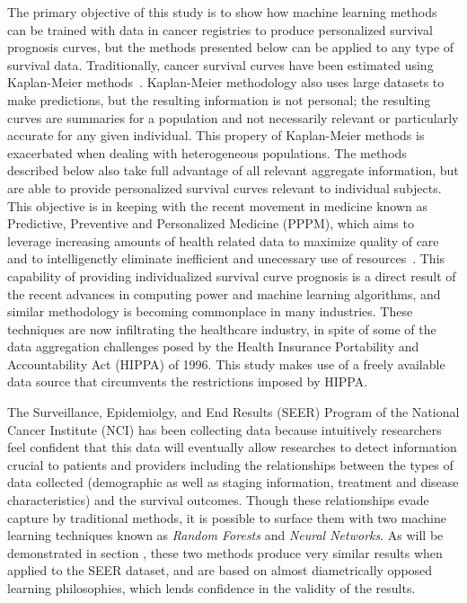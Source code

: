 \documentclass[10pt,letterpaper]{article}
\begin{document}
The primary objective of this study is to show how machine learning methods can be trained with data in cancer registries to produce personalized survival prognosis curves, but the methods presented below can be applied to any type of survival data. Traditionally, cancer survival curves have been estimated using Kaplan-Meier methods~\cite{cam}. Kaplan-Meier methodology also uses large datasets to make predictions, but the resulting information is not personal; the resulting curves are summaries for a population and not necessarily relevant or particularly accurate for any given individual. This propery of Kaplan-Meier methods is exacerbated when dealing with heterogeneous populations.  The methods described below also take full advantage of all relevant aggregate information, but are able to provide personalized survival curves relevant to individual subjects. This objective is in keeping with the recent movement in medicine known as Predictive, Preventive and Personalized Medicine (PPPM), which aims to leverage increasing amounts of health related data to maximize quality of care and to intelligenctly eliminate inefficient and unecessary use of resources~\cite{VanPoucke2016}.
This capability of providing individualized survival curve prognosis is a direct result of the recent advances in computing power and machine learning algorithms, and similar methodology is becoming commonplace in many industries.
 These techniques are now infiltrating the healthcare industry, in spite of some of the data aggregation challenges posed by the Health Insurance Portability and Accountability Act (HIPPA) of 1996. This study makes use of a freely available data source that circumvents the restrictions imposed by HIPPA.



The Surveillance, Epidemiolgy, and End Results (SEER) Program of the National Cancer Institute (NCI) has been collecting data because intuitively 
researchers feel confident
 that this data will eventually allow researches to detect information crucial to patients and providers including the relationships between the types of data collected (demographic as well as staging information, treatment and disease characteristics) and the survival outcomes.
Though these relationships evade capture by traditional methods, it is possible to surface them with two machine learning techniques known as \emph{Random Forests} and \emph{Neural Networks}. As will be demonstrated in section , these two methods produce very similar results when applied to the SEER dataset, and are based on almost diametrically opposed learning philosophies, which lends confidence in the validity of the results.
\end{document}
